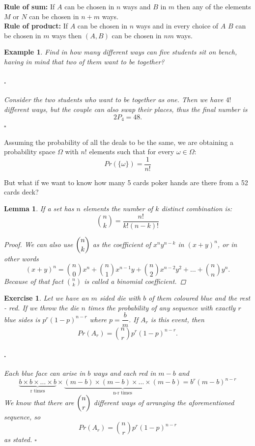 \documentclass[12pt, a4paper,leqno]{report}
\newenvironment{solution}{\paragraph{\normalfont{\textit{Solution}}.}}{\hfill\null$\square$}
\newtheorem{lemma}{Lemma}[chapter]
\theoremstyle{normal}
\newtheorem{exercise}{Exercise}[chapter]
\theoremstyle{normal}
\newtheorem{example}{Example}[chapter]
\begin{document}
	\noindent\textbf{Rule of sum:} If $A$ can be chosen in $n$ ways and $B$ in $m$ then any of the elements $M$ or $N$ can be chosen in $n+m$ ways.\\
	
	\noindent\textbf{Rule of product:} If $A$ can be chosen in $n$ ways and in every choice of $A$ $B$ can be chosen in $m$ ways then $(A, B)$ can be chosen in $nm$ ways.\\
	
	\begin{example}
		Find in how many different ways can five students sit on bench, having in mind that two of them want to be together?
		\begin{solution}
			Consider the two students who want to be together as one. Then we have $4!$ different ways, but the couple can also swap their places, thus the final number is
			\[ 2P_4 = 48. \]  
		\end{solution}
	\end{example}
		
	Assuming the probability of all the deals to be the same, we are obtaining a probability space $\Omega$ with $n!$ elements such that for every $\omega\in\Omega$:
	\[ Pr(\lbrace\omega\rbrace) = \frac{1}{n!} \]
	
	But what if we want to know how many 5 cards poker hands are there from a 52 cards deck?
	
	\begin{lemma}
		If a set has $n$ elements the number of $k$ distinct combination is:
		\[ \binom{n}{k} = \frac{n!}{k!(n-k)!} \]
		\begin{proof}
			We can also use $\dbinom{n}{k}$ as the coefficient of $x^ny^{n-k}$ in $(x+y)^n$, or in other words
			\[ (x+y)^n = \binom{n}{0}x^n + \binom{n}{1}x^{n-1}y + \binom{n}{2}x^{n-2}y^2 +\dots + \binom{n}{n}y^n. \]
			Because of that fact $\binom{n}{k}$ is called a \textit{binomial coefficient}.
		\end{proof}
	\end{lemma}
	
	\begin{exercise}
		 Let we have an $m$ sided die with $b$ of them coloured blue and the rest - red. If we throw the die $n$ times the probability of any sequence with exactly $r$ blue sides is $p^r(1-p)^{n-r}$ where $p = \dfrac{b}{m}$.
		 If $A_r$ is this event, then
		 \[ Pr(A_r) = \binom{n}{r}p^r(1-p)^{n-r}. \]
		 \begin{solution}
		 	Each blue face can arise in $b$ ways and each red in $m-b$ and
		 	\[ \underbrace{b\times b\times\dots\times b}_{\mbox{r times}}\times \underbrace{(m-b)\times (m-b)\times\dots\times (m-b)}_{\mbox{n-r times}} = b^r(m-b)^{n-r} \]
		 	We know that there are $\dbinom{n}{r}$ different ways of arranging the aforementioned sequence, so
		 	\[ Pr(A_r) = \binom{n}{r}p^r(1-p)^{n-r} \]
		 	as stated.
		 \end{solution}
	\end{exercise}
	
\end{document}
